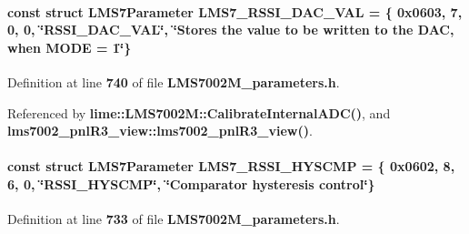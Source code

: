 \paragraph[{L\+M\+S7\+\_\+\+R\+S\+S\+I\+\_\+\+D\+A\+C\+\_\+\+V\+AL}]{\setlength{\rightskip}{0pt plus 5cm}const struct {\bf L\+M\+S7\+Parameter} L\+M\+S7\+\_\+\+R\+S\+S\+I\+\_\+\+D\+A\+C\+\_\+\+V\+AL = \{ 0x0603, 7, 0, 0, \char`\"{}\+R\+S\+S\+I\+\_\+\+D\+A\+C\+\_\+\+V\+A\+L\char`\"{}, \char`\"{}\+Stores the value to be written to the D\+A\+C, when M\+O\+D\+E = 1\char`\"{}\}\hspace{0.3cm}{\ttfamily [static]}}\label{LMS7002M__parameters_8h_a4fa0f97344f914b7bbba762f30cf4ce4}


Definition at line {\bf 740} of file {\bf L\+M\+S7002\+M\+\_\+parameters.\+h}.



Referenced by {\bf lime\+::\+L\+M\+S7002\+M\+::\+Calibrate\+Internal\+A\+D\+C()}, and {\bf lms7002\+\_\+pnl\+R3\+\_\+view\+::lms7002\+\_\+pnl\+R3\+\_\+view()}.

\paragraph[{L\+M\+S7\+\_\+\+R\+S\+S\+I\+\_\+\+H\+Y\+S\+C\+MP}]{\setlength{\rightskip}{0pt plus 5cm}const struct {\bf L\+M\+S7\+Parameter} L\+M\+S7\+\_\+\+R\+S\+S\+I\+\_\+\+H\+Y\+S\+C\+MP = \{ 0x0602, 8, 6, 0, \char`\"{}\+R\+S\+S\+I\+\_\+\+H\+Y\+S\+C\+M\+P\char`\"{}, \char`\"{}\+Comparator hysteresis control\char`\"{}\}\hspace{0.3cm}{\ttfamily [static]}}\label{LMS7002M__parameters_8h_a18cad88337366c373a9605f5f56e8c78}


Definition at line {\bf 733} of file {\bf L\+M\+S7002\+M\+\_\+parameters.\+h}.



